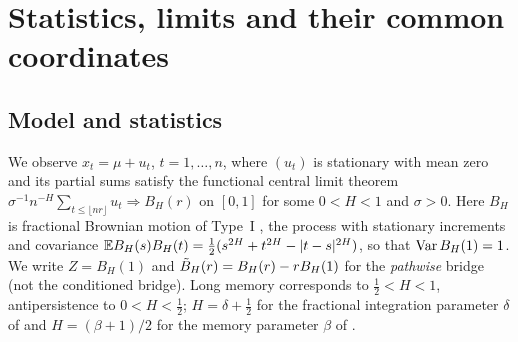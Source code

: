 \section{Statistics, limits and their common coordinates}\label{sec:setting}

\subsection{Model and statistics}
We observe $x_t=\mu+u_t$, $t=1,\dots,n$, where $(u_t)$ is stationary with mean zero and its partial sums satisfy the
functional central limit theorem $\sigma^{-1}n^{-H}\sum_{t\le\lfloor nr\rfloor}u_t\Rightarrow B_H(r)$ on $[0,1]$ for some
$0<H<1$ and $\sigma>0$. Here $B_H$ is fractional Brownian motion of Type~I \citep{MvN68}, the process with stationary
increments and covariance $\mathbb E B_H(s)B_H(t)=\frac12(s^{2H}+t^{2H}-|t-s|^{2H})$, so that $\operatorname{Var} B_H(1)=1$. We write
$Z=B_H(1)$ and $\tilde B_H(r)=B_H(r)-rB_H(1)$ for the \emph{pathwise} bridge (not the conditioned bridge). Long memory
corresponds to $\frac12<H<1$, antipersistence to $0<H<\frac12$; $H=\delta+\frac12$ for the fractional integration
parameter $\delta$ of \citet{HI17} and $H=(\beta+1)/2$ for the memory parameter $\beta$ of \citet{MP12}.

